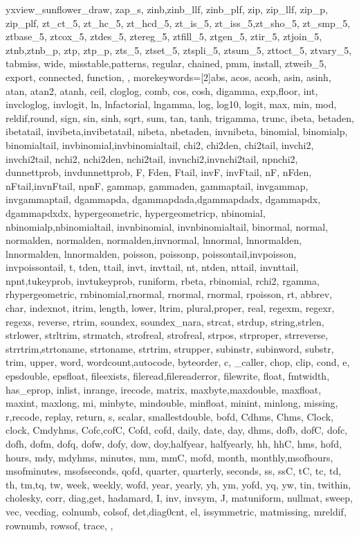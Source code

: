 {{yxview_sunflower_draw, zap_s, zinb,zinb_llf, zinb_plf, zip, zip_llf, zip_p, zip_plf, zt_ct_5, zt_hc_5, zt_hcd_5, zt_is_5, zt_iss_5,zt_sho_5, zt_smp_5, ztbase_5, ztcox_5, ztdes_5, ztereg_5, ztfill_5, ztgen_5, ztir_5, ztjoin_5, ztnb,ztnb_p, ztp, ztp_p, zts_5, ztset_5, ztspli_5, ztsum_5, zttoct_5, ztvary_5, tabmiss, wide, misstable,patterns, regular, chained, pmm, install, ztweib_5, export, connected, function,
	},
	morekeywords=[2]{abs, acos, acosh, asin, asinh, atan, atan2, atanh, ceil, cloglog, comb, cos, cosh, digamma, exp,floor, int, invcloglog, invlogit, ln, lnfactorial, lngamma, log, log10, logit, max, min, mod, reldif,round, sign, sin, sinh, sqrt, sum, tan, tanh, trigamma, trunc, ibeta, betaden, ibetatail, invibeta,invibetatail, nibeta, nbetaden, invnibeta, binomial, binomialp, binomialtail, invbinomial,invbinomialtail, chi2, chi2den, chi2tail, invchi2, invchi2tail, nchi2, nchi2den, nchi2tail, invnchi2,invnchi2tail, npnchi2, dunnettprob, invdunnettprob, F, Fden, Ftail, invF, invFtail, nF, nFden, nFtail,invnFtail, npnF, gammap, gammaden, gammaptail, invgammap, invgammaptail, dgammapda, dgammapdada,dgammapdadx, dgammapdx, dgammapdxdx, hypergeometric, hypergeometricp, nbinomial, nbinomialp,nbinomialtail, invnbinomial, invnbinomialtail, binormal, normal, normalden, normalden, normalden,invnormal, lnnormal, lnnormalden, lnnormalden, lnnormalden, poisson, poissonp, poissontail,invpoisson, invpoissontail, t, tden, ttail, invt, invttail, nt, ntden, nttail, invnttail, npnt,tukeyprob, invtukeyprob, runiform, rbeta, rbinomial, rchi2, rgamma, rhypergeometric, rnbinomial,rnormal, rnormal, rnormal, rpoisson, rt, abbrev, char, indexnot, itrim, length, lower, ltrim, plural,proper, real, regexm, regexr, regexs, reverse, rtrim, soundex, soundex_nara, strcat, strdup, string,strlen, strlower, strltrim, strmatch, strofreal, strofreal, strpos, strproper, strreverse, strrtrim,strtoname, strtoname, strtrim, strupper, subinstr, subinword, substr, trim, upper, word, wordcount,autocode, byteorder, c, _caller, chop, clip, cond, e, epsdouble, epsfloat, fileexists, fileread,filereaderror, filewrite, float, fmtwidth, has_eprop, inlist, inrange, irecode, matrix, maxbyte,maxdouble, maxfloat, maxint, maxlong, mi, minbyte, mindouble, minfloat, minint, minlong, missing, r,recode, replay, return, s, scalar, smallestdouble, bofd, Cdhms, Chms, Clock, clock, Cmdyhms, Cofc,cofC, Cofd, cofd, daily, date, day, dhms, dofb, dofC, dofc, dofh, dofm, dofq, dofw, dofy, dow, doy,halfyear, halfyearly, hh, hhC, hms, hofd, hours, mdy, mdyhms, minutes, mm, mmC, mofd, month, monthly,msofhours, msofminutes, msofseconds, qofd, quarter, quarterly, seconds, ss, ssC, tC, tc, td, th, tm,tq, tw, week, weekly, wofd, year, yearly, yh, ym, yofd, yq, yw, tin, twithin, cholesky, corr, diag,get, hadamard, I, inv, invsym, J, matuniform, nullmat, sweep, vec, vecdiag, colnumb, colsof, det,diag0cnt, el, issymmetric, matmissing, mreldif, rownumb, rowsof, trace,
	},
}




